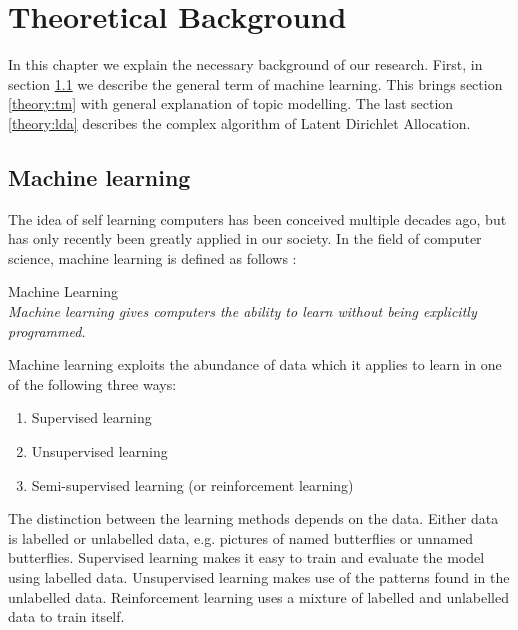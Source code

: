 \chapter{Theoretical Background}  \label{ch:theory}

In this chapter we explain the necessary background of our research. First, in section \ref{theory:machinelearning} we describe the general term of machine learning. This brings section \ref{theory:tm} with general explanation of topic modelling. The last section \ref{theory:lda} describes the complex algorithm of Latent Dirichlet Allocation.

\section{Machine learning} \label{theory:machinelearning}
The idea of self learning computers has been conceived multiple decades ago, but has only recently been greatly applied in our society.
In the field of computer science, machine learning is defined as follows \cite{Samuel1959SomeCheckers}:\\

\theoremstyle{definition} 
\begin{definition}{Machine Learning} 
\\\textit{Machine learning gives computers the ability to learn without being explicitly programmed.}
\end{definition}

Machine learning exploits the abundance of data which it applies to learn in one of the following three ways:

\begin{enumerate}
    \item Supervised learning
    \item Unsupervised learning
    \item Semi-supervised learning (or reinforcement learning)
\end{enumerate}

The distinction between the learning methods depends on the data. Either data is labelled or unlabelled data, e.g. pictures of named butterflies or unnamed butterflies. Supervised learning makes it easy to train and evaluate the model using labelled data. Unsupervised learning makes use of the patterns found in the unlabelled data. Reinforcement learning uses a mixture of labelled and unlabelled data to train itself. 

